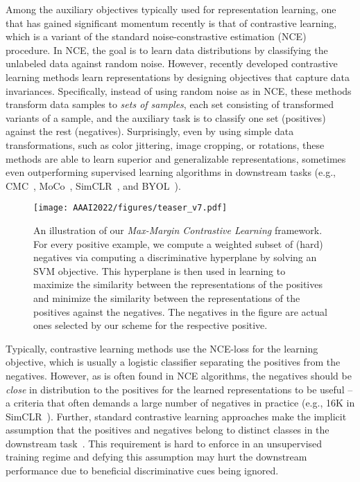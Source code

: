 \documentclass[letterpaper]{article} \usepackage{aaai22}  \usepackage{times}  \usepackage{helvet}  \usepackage{courier}  \usepackage[hyphens]{url}  \usepackage{graphicx} \urlstyle{rm} \def\UrlFont{\rm}  \usepackage{natbib}  \usepackage{caption} \DeclareCaptionStyle{ruled}{labelfont=normalfont,labelsep=colon,strut=off} \frenchspacing  \setlength{\pdfpagewidth}{8.5in}  \setlength{\pdfpageheight}{11in}
\begin{document}
    
Among the auxiliary objectives typically used for representation learning, one that has gained significant momentum recently is that of contrastive learning, which is a variant of the standard noise-constrastive estimation (NCE)~\cite{gutmann2010noise} procedure. In NCE, the goal is to learn data distributions by classifying the unlabeled data against random noise. However, recently developed contrastive learning methods learn representations by designing objectives that capture data invariances. Specifically, instead of using random noise as in NCE, these methods transform data samples to \emph{sets of samples}, each set consisting of transformed variants of a sample, and the auxiliary task is to classify one set (positives) against the rest (negatives). Surprisingly, even by using simple data transformations, such as color jittering, image cropping, or rotations, these methods are able to learn superior and generalizable representations, sometimes even outperforming supervised learning algorithms in downstream tasks (e.g., CMC~\cite{tian2019contrastive}, MoCo~\cite{chen2020improved,he2020momentum}, SimCLR~\cite{chen2020simple}, and BYOL~\cite{grill2020bootstrap}).

\begin{figure}
        \centering
        \texttt{[image: AAAI2022/figures/teaser\_v7.pdf]}
        \caption{An illustration of our \emph{Max-Margin Contrastive Learning} framework. For every positive example, we compute a weighted subset of (hard) negatives via computing a discriminative hyperplane by solving an SVM objective. This hyperplane is then used in learning to maximize the similarity between the representations of the positives and minimize the similarity between the representations of the positives against the negatives. The negatives in the figure are actual ones selected by our scheme for the respective positive.}
        \vspace*{-0.5cm}
        \label{fig: teaser_fig}
    \end{figure}
    
Typically, contrastive learning methods use the NCE-loss
for the learning objective, which is usually a logistic
classifier separating the positives from the negatives. However, as is often found in NCE algorithms, the negatives should be \emph{close} in distribution to the positives for the learned representations to be useful -- a criteria that often demands a large number of negatives in practice (e.g., 16K in SimCLR~\cite{chen2020simple}). Further, standard contrastive learning approaches make the implicit assumption that the positives and negatives belong to distinct classes in the downstream task~\cite{arora2019theoretical}. This requirement is hard to enforce in an unsupervised training regime and defying this assumption may hurt the downstream performance due to beneficial discriminative cues being ignored.
\end{document}
